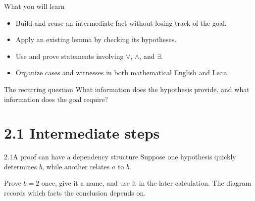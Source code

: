 


\begin{frame}\titlepage\end{frame}

\begin{frame}{What you will learn}
\begin{itemize}
\item Build and reuse an intermediate fact without losing track of the goal.
\item Apply an existing lemma by checking its hypotheses.
\item Use and prove statements involving $\lor$, $\land$, and $\exists$.
\item Organize cases and witnesses in both mathematical English and Lean.
\end{itemize}
\begin{block}{The recurring question}
What information does the hypothesis provide, and what information does the goal require?
\end{block}
\end{frame}

\section{2.1 Intermediate steps}
\begin{frame}{2.1\quad A proof can have a dependency structure}
Suppose one hypothesis quickly determines $b$, while another relates $a$ to $b$.
\begin{center}
\end{center}
Prove $b=2$ once, give it a name, and use it in the later calculation.
The diagram records which facts the conclusion depends on.
\end{frame}

